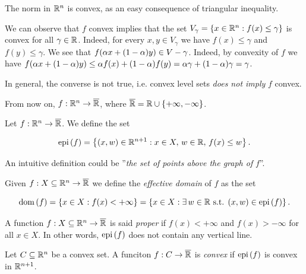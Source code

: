 \begin{example}
    
    The norm in ${\mathbb{R}^n}$ is convex, as an easy consequence of triangular inequality.

\end{example}

We can observe that $f$ convex implies that the set $V_\gamma = \left\{ x \in {\mathbb{R}^n} : f(x) \le \gamma \right\}$ is convex for all $\gamma \in \mathbb{R}$. Indeed, for every $x,y \in V_\gamma$ we have $f(x)\le \gamma$ and $f(y) \le \gamma$. We see that $f(\alpha x + (1-\alpha)y) \in V-\gamma$. Indeed, by convexity of $f$ we have $f(\alpha x + (1-\alpha)y) \le \alpha f(x) + (1-\alpha)f(y) = \alpha\gamma + (1-\alpha)\gamma = \gamma$. 

In general, the converse is not true, i.e. convex level sets \emph{does not imply} $f$ convex.

From now on, $f : {\mathbb{R}^n} \to \overline{\mathbb{R}}$, where $\overline{\mathbb{R}} = \mathbb{R} \cup \left\{ +\infty, -\infty \right\}$. 

\begin{definition}[Epigraph]
    
    Let $f : {\mathbb{R}^n} \to \overline{\mathbb{R}}$. We define the set 

    \[ \mathrm{epi}\left(f\right) = \left\{ (x,w) \in {\mathbb{R}^{n+1}} : x \in X, \, w \in \mathbb{R}, \, f(x) \le w \right\}. \]

    An intuitive definition could be ''\emph{the set of points above the graph of} $f$''.

\end{definition}

\begin{definition}
    
    Given $f : X \subseteq {\mathbb{R}^n} \to \overline{\mathbb{R}}$ we define the \emph{effective domain} of $f$ as the set 

    \[ \mathrm{dom}\left(f\right) = \left\{ x \in X : f(x) < +\infty \right\} = \left\{ x \in X : \exists\, w \in \mathbb{R} \text{ s.t. } (x,w) \in \mathrm{epi}\left(f\right) \right\}. \]

\end{definition}

\begin{definition}

    A function $f : X \subseteq {\mathbb{R}^n} \to \overline{\mathbb{R}}$ is said \emph{proper} if $f(x) < +\infty$ and $f(x) > -\infty$ for all $x \in X$. In other words, $\mathrm{epi}\left(f\right)$ does not contain any vertical line.
    
\end{definition}

\begin{definition}

    Let $C \subseteq {\mathbb{R}^n}$ be a convex set. A funciton $f : C \to \overline{\mathbb{R}}$ is \emph{convex} if $\mathrm{epi}\left(f\right)$ is convex in ${\mathbb{R}^{n+1}}$.
    
\end{definition}

